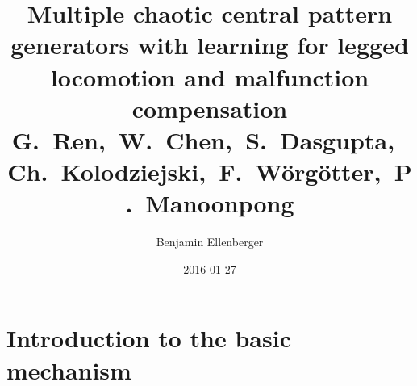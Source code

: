 \documentclass{beamer}
\institute{INI:  Institute of Neuroinformatics}
\title{Multiple chaotic central pattern generators with learning for legged locomotion and malfunction compensation\\
{\footnotesize G.~Ren,~W.~Chen,~S.~Dasgupta,~Ch.~Kolodziejski,~F.~W\"org\"otter,~P.~Manoonpong}}
\date{2016-01-27}
\begin{document}
\titleframe

\author{Benjamin Ellenberger}

\section{}

\section{Introduction to the basic mechanism}

\end{document}
